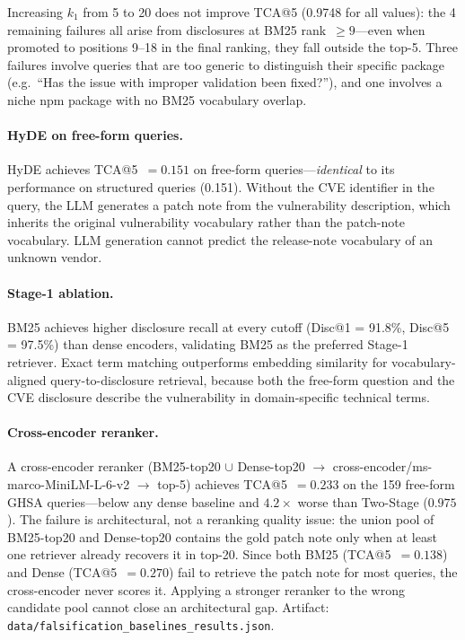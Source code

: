 \documentclass[11pt]{article}
\begin{document}
Increasing $k_1$ from 5 to 20 does not improve TCA@5 (0.9748 for all values): the 4 remaining failures all arise from disclosures at BM25 rank~$\geq 9$---even when promoted to positions 9--18 in the final ranking, they fall outside the top-5. Three failures involve queries that are too generic to distinguish their specific package (e.g.\ ``Has the issue with improper validation been fixed?''), and one involves a niche npm package with no BM25 vocabulary overlap.

\paragraph{HyDE on free-form queries.} HyDE achieves TCA@5~$= 0.151$ on free-form queries---\emph{identical} to its performance on structured queries (0.151). Without the CVE identifier in the query, the LLM generates a patch note from the vulnerability description, which inherits the original vulnerability vocabulary rather than the patch-note vocabulary. LLM generation cannot predict the release-note vocabulary of an unknown vendor.

\paragraph{Stage-1 ablation.} BM25 achieves higher disclosure recall at every cutoff (Disc@1 = 91.8\%, Disc@5 = 97.5\%) than dense encoders, validating BM25 as the preferred Stage-1 retriever. Exact term matching outperforms embedding similarity for vocabulary-aligned query-to-disclosure retrieval, because both the free-form question and the CVE disclosure describe the vulnerability in domain-specific technical terms.

\paragraph{Cross-encoder reranker.}
A cross-encoder reranker (BM25-top20 $\cup$ Dense-top20 $\to$ cross-encoder/ms-marco-MiniLM-L-6-v2 $\to$ top-5) achieves TCA@5~$= 0.233$ on the 159 free-form GHSA queries---below any dense baseline and $4.2\times$ worse than Two-Stage ($0.975$). The failure is architectural, not a reranking quality issue: the union pool of BM25-top20 and Dense-top20 contains the gold patch note only when at least one retriever already recovers it in top-20. Since both BM25 (TCA@5~$= 0.138$) and Dense (TCA@5~$= 0.270$) fail to retrieve the patch note for most queries, the cross-encoder never scores it. Applying a stronger reranker to the wrong candidate pool cannot close an architectural gap. Artifact: \texttt{data/falsification\_baselines\_results.json}.
\end{document}
